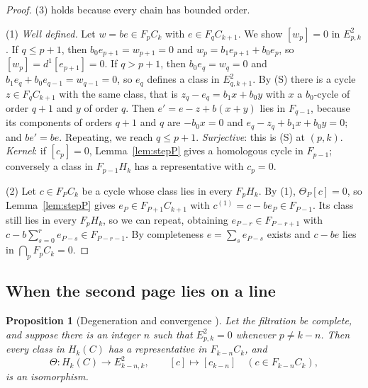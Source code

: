 \documentclass[11pt,oneside,reqno]{article}
\theoremstyle{plain}
\newtheorem{proposition}[theorem]{Proposition}
\theoremstyle{definition}
\theoremstyle{remark}
\begin{document}
\begin{proof}
(3) holds because every chain has bounded order.

(1) \emph{Well defined.} Let \(w=be\in F_pC_k\) with \(e\in F_qC_{k+1}\). We show
\([w_p]=0\) in \(E^2_{p,k}\). If \(q\le p+1\), then \(b_0e_{p+1}=w_{p+1}=0\) and
\(w_p=b_1e_{p+1}+b_0e_p\), so \([w_p]=d^1[e_{p+1}]=0\). If \(q>p+1\), then
\(b_0e_q=w_q=0\) and \(b_1e_q+b_0e_{q-1}=w_{q-1}=0\), so \(e_q\) defines a class in
\(E^2_{q,k+1}\). By (S) there is a cycle \(z\in F_qC_{k+1}\) with the same class,
that is \(z_q-e_q=b_1x+b_0y\) with \(x\) a \(b_0\)-cycle of order \(q+1\) and \(y\) of
order \(q\). Then \(e'=e-z+b(x+y)\) lies in \(F_{q-1}\), because its components of
orders \(q+1\) and \(q\) are \(-b_0x=0\) and \(e_q-z_q+b_1x+b_0y=0\); and \(be'=be\).
Repeating, we reach \(q\le p+1\).
\emph{Surjective}: this is (S) at \((p,k)\). \emph{Kernel}: if \([c_p]=0\),
Lemma~\ref{lem:stepP} gives a homologous cycle in \(F_{p-1}\); conversely a
class in \(F_{p-1}H_k\) has a representative with \(c_p=0\).

(2) Let \(c\in F_PC_k\) be a cycle whose class lies in every \(F_pH_k\). By (1),
\(\Theta_P[c]=0\), so Lemma~\ref{lem:stepP} gives \(e_P\in F_{P+1}C_{k+1}\) with
\(c^{(1)}=c-be_P\in F_{P-1}\). Its class still lies in every \(F_pH_k\), so we
can repeat, obtaining \(e_{P-r}\in F_{P-r+1}\) with
\(c-b\sum_{s=0}^{r}e_{P-s}\in F_{P-r-1}\). By completeness \(e=\sum_se_{P-s}\)
exists and \(c-be\) lies in \(\bigcap_pF_pC_k=0\).
\end{proof}

\subsection{When the second page lies on a line}\label{subsec:line}

\begin{proposition}[Degeneration and convergence {\cite[Ch.~10]{MelroseMicro}}]
\label{prop:line}
Let the filtration be complete, and suppose there is an integer \(n\) such that
\(E^2_{p,k}=0\) whenever \(p\neq k-n\). Then every class in \(H_k(C)\) has a
representative in \(F_{k-n}C_k\), and
\[
 \Theta:H_k(C)\to E^2_{k-n,k},\qquad [c]\mapsto[c_{k-n}]\quad(c\in F_{k-n}C_k),
\]
is an isomorphism.
\end{proposition}
\end{document}
